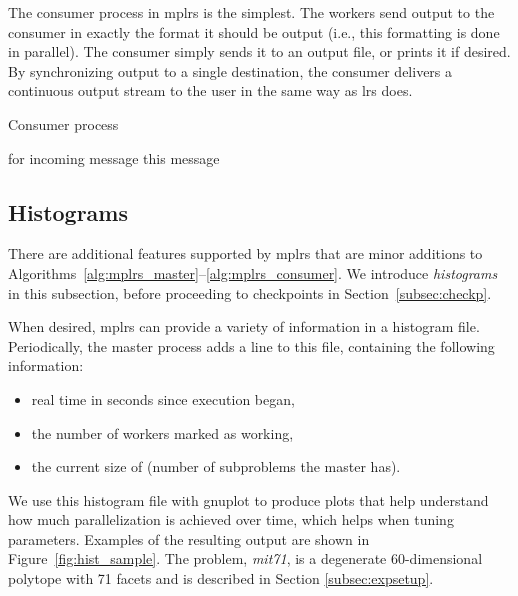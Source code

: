 \documentclass[a4paper,11pt]{article}   \usepackage{authblk} \usepackage[top=1.9cm,bottom=1.9cm,left=1.9cm,right=1.9cm]{geometry}
\newcommand{\progname}{\textsf}
\newcommand{\lrs}{\progname{lrs}\xspace}
\newcommand{\mplrs}{\progname{mplrs}\xspace}
\newcommand{\gnuplot}{\progname{gnuplot}\xspace}
\newcommand{\polytope}{\emph}
\newcommand{\mitseven}{\polytope{mit71}\xspace}
\newcommand{\mytrue}{\ensuremath{\textrm{true}}\xspace}
\begin{document}
The consumer process in \mplrs is the simplest.  The workers send output
to the consumer in exactly the format it should be output (i.e., this
formatting is done in parallel).  The consumer simply sends it to an
output file, or prints it if desired.  By synchronizing output to a
single destination, the consumer delivers a continuous output
stream to the user in the same way as 
\lrs does.

\begin{algorithm}
 \caption{Consumer process}
 \label{alg:mplrs_consumer}
 \begin{algorithmic}[1]
   \While {\mytrue}
     for incoming message
    \EndIf
     this message
   \EndWhile
  \EndProcedure
 \end{algorithmic}
\end{algorithm}

\subsection{Histograms}
\label{subsec:histo}

There are additional features supported by \mplrs that
are minor additions to 
Algorithms~\ref{alg:mplrs_master}--\ref{alg:mplrs_consumer}.
We introduce \emph{histograms} in this subsection, before proceeding
to checkpoints in Section~\ref{subsec:checkp}.

When desired, \mplrs can provide a variety of information in a
histogram file.  Periodically, the master process
adds a line to this file, containing the following information:
\begin{itemize}
 \item real time in seconds since execution began,
 \item the number of workers marked as working,
 \item the current size of  (number of subproblems the master has).
\end{itemize}

We use this histogram file with \gnuplot to produce
plots that help understand how much parallelization is achieved over
time, which helps when tuning parameters.  Examples of the resulting output
are shown in Figure~\ref{fig:hist_sample}. The problem, \mitseven, 
is a degenerate 60-dimensional polytope with 71 facets
and is described in
Section \ref{subsec:expsetup}. 
\end{document}
